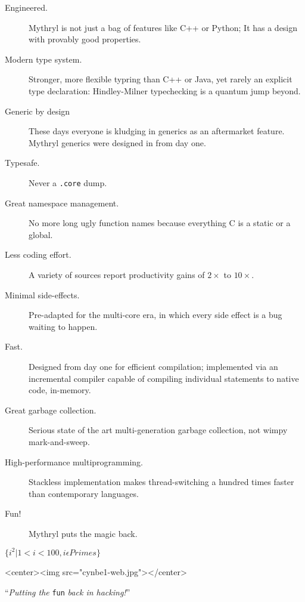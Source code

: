 \documentclass{book}
\begin{document}
\begin{description}
\item[Engineered.] Mythryl is not just a bag of features like C++ or Python;  It has a design with provably good properties.
\item[Modern type system.] Stronger, more flexible typring than C++ or Java, yet rarely an explicit type declaration:  Hindley-Milner typechecking is a quantum jump beyond.
\item[Generic by design]  These days everyone is kludging in generics as an aftermarket feature.  Mythryl generics were designed in from day one.
\item[Typesafe.]  Never a \verb#.core# dump.
\item[Great namespace management.]  No more long ugly function names because everything C is a static or a global.
\item[Less coding effort.]  A variety of sources report productivity gains of $2\times$ to $10\times$.
\item[Minimal side-effects.]  Pre-adapted for the multi-core era, in which every side effect is a bug waiting to happen.
\item[Fast.]  Designed from day one for efficient compilation;  implemented via an incremental compiler capable of compiling individual statements to native code, in-memory.
\item[Great garbage collection.]  Serious state of the art multi-generation garbage collection, not wimpy mark-and-sweep.
\item[High-performance multiprogramming.]  Stackless implementation makes thread-switching a hundred times faster than contemporary languages.
\item[Fun!]  Mythryl puts the magic back.
\end{description}


$\{ i^{2} | 1 < i < 100, i \epsilon Primes \}$


\begin{rawhtml}
<center><img src="cynbe1-web.jpg"></center>
\end{rawhtml}

\begin{center}
``{\em Putting the} {\tt fun} {\em back in hacking!}''
\end{center}
\end{document}
